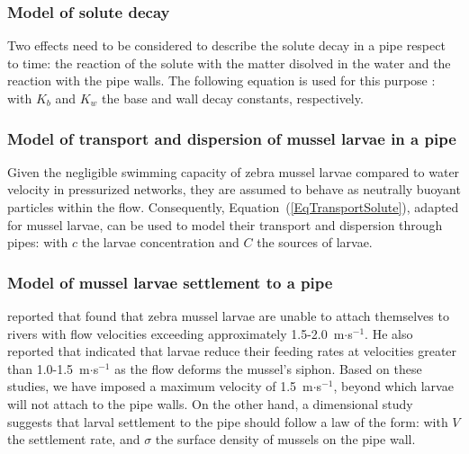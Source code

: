 \documentclass[review,authoryear]{elsarticle}
\begin{document}
\subsubsection{Model of solute decay}

Two effects need to be considered to describe the solute decay in a pipe respect
to time: the reaction of the solute with the matter disolved in the water and
the reaction with the pipe walls. The following equation is used for this
purpose \citep{DiGianoZhang05}:
with $K_b$ and $K_w$ the base and wall decay constants, respectively. 

\subsubsection{Model of transport and dispersion of mussel larvae in a pipe}

Given the negligible swimming capacity of zebra mussel larvae compared to water
velocity in pressurized networks, they are assumed to behave as neutrally
buoyant particles within the flow. Consequently,
Equation~(\ref{EqTransportSolute}), adapted for mussel larvae, can be used to
model their transport and dispersion through pipes:
with $c$ the larvae concentration and $C$ the sources of larvae.

\subsubsection{Model of mussel larvae settlement to a pipe}

\citet{Cohen05} reported that \citet{Boelman97} found that zebra mussel larvae
are unable to attach themselves to rivers with flow velocities exceeding
approximately 1.5-2.0~m$\cdot$s$^{-1}$. He also reported that
\citet{SmirnovaVinogradov90} indicated that larvae reduce their feeding rates at
velocities greater than 1.0-1.5~m$\cdot$s$^{-1}$ as the flow deforms the
mussel's siphon. Based on these studies, we have imposed a maximum velocity of
1.5~m$\cdot$s$^{-1}$, beyond which larvae will not attach to the pipe walls. On
the other hand, a dimensional study suggests that larval settlement to the pipe
should follow a law of the form:
with $V$ the settlement rate, and $\sigma$ the surface density of mussels on
the pipe wall.
\end{document}
